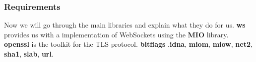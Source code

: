 \subsubsection{Requirements}
Now we will go through the main libraries and explain what they do for
us. \textbf{ws} provides us with a implementation of WebSockets using
the \textbf{MIO} library. \textbf{openssl} is the toolkit for the TLS
protocol.  \textbf{bitflags} .\textbf{idna}, \textbf{miom},
\textbf{miow}, \textbf{net2}, \textbf{sha1}, \textbf{slab}, \textbf{url}.
